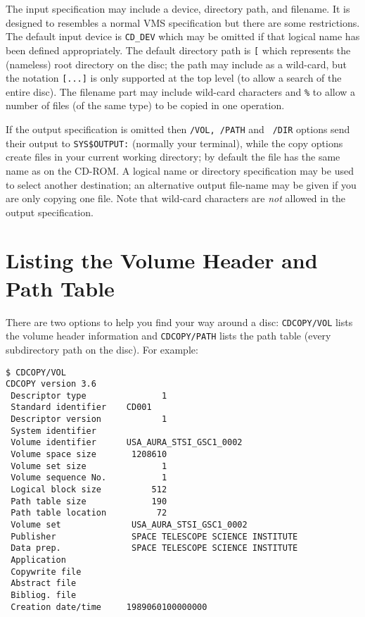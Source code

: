 The input specification may include a device, directory path, and
filename. It is designed to resembles a normal VMS specification but
there are some restrictions. The default input device is {\tt CD\_DEV}
which may be omitted if that logical name has been defined appropriately.
The default directory path is {\tt [}\hspace{1mm}{\tt ]} which
represents the (nameless) root directory on the disc; the path may
include {\tt *} as a wild-card, but the notation {\tt [...]} is only
supported at the top level (to allow a search of the entire disc). The
filename part may include wild-card characters {\tt *} and {\tt \%} to
allow a number of files (of the same type) to be copied in one
operation.

If the output specification is omitted then {\tt /VOL, /PATH} and {\tt
/DIR} options send their output to \verb+SYS$OUTPUT:+ (normally your
terminal), while the copy options create files in your current working
directory; by default the file has the same name as on the CD-ROM. A
logical name or directory specification may be used to select another
destination; an alternative output file-name may be given if you are
only copying one file. Note that wild-card characters are {\em not}
allowed in the output specification.

\section{Listing the Volume Header and Path Table}

There are two options to help you find your way around a disc:
{\tt CDCOPY/VOL} lists the volume header information and {\tt CDCOPY/PATH}
lists the path table (every subdirectory path on the disc). For example:
\goodbreak
\begin{verbatim}
$ CDCOPY/VOL
CDCOPY version 3.6
 Descriptor type               1
 Standard identifier    CD001
 Descriptor version            1
 System identifier
 Volume identifier      USA_AURA_STSI_GSC1_0002
 Volume space size       1208610
 Volume set size               1
 Volume sequence No.           1
 Logical block size          512
 Path table size             190
 Path table location          72
 Volume set              USA_AURA_STSI_GSC1_0002
 Publisher               SPACE TELESCOPE SCIENCE INSTITUTE
 Data prep.              SPACE TELESCOPE SCIENCE INSTITUTE
 Application
 Copywrite file
 Abstract file
 Bibliog. file
 Creation date/time     1989060100000000
\end{verbatim}

